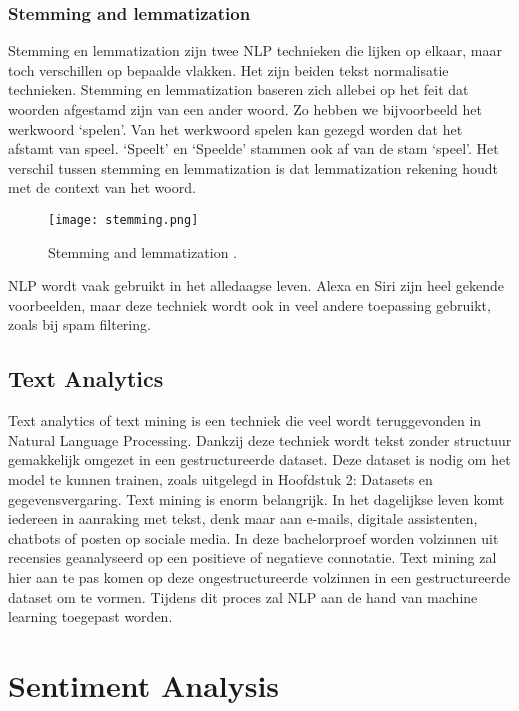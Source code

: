 \subsubsection{Stemming and lemmatization}
\label{sec:stemming}

Stemming en lemmatization zijn twee NLP technieken die lijken op elkaar, maar toch verschillen op bepaalde vlakken. Het zijn beiden tekst normalisatie technieken. Stemming en lemmatization baseren zich allebei op het feit dat woorden afgestamd zijn van een ander woord. Zo hebben we bijvoorbeeld het werkwoord ‘spelen’. Van het werkwoord spelen kan gezegd worden dat het afstamt van speel. ‘Speelt’ en ‘Speelde’ stammen ook af van de stam ‘speel’. Het verschil tussen stemming en lemmatization is dat lemmatization rekening houdt met de context van het woord. \autocite{sas2020}

\begin{figure}[!htbp]
    \texttt{[image: stemming.png]}
    \caption{\label{stemming}Stemming and lemmatization \autocite{sas2020}.}
\end{figure}
\FloatBarrier

NLP wordt vaak gebruikt in het alledaagse leven. Alexa en Siri zijn heel gekende voorbeelden, maar deze techniek wordt ook in veel andere toepassing gebruikt, zoals bij spam filtering. 

\subsection{Text Analytics}
\label{sec:textanalytics}

Text analytics of text mining is een techniek die veel wordt teruggevonden in Natural Language Processing. Dankzij deze techniek wordt tekst zonder structuur gemakkelijk omgezet in een gestructureerde dataset. \autocite{Linguamatics2021} Deze dataset is nodig om het model te kunnen trainen, zoals uitgelegd in Hoofdstuk 2: Datasets en gegevensvergaring.
Text mining is enorm belangrijk. In het dagelijkse leven komt iedereen in aanraking met tekst, denk maar aan e-mails, digitale assistenten, chatbots of posten op sociale media. In deze bachelorproef worden volzinnen uit recensies geanalyseerd op een positieve of negatieve connotatie. Text mining zal hier aan te pas komen op deze ongestructureerde volzinnen in een gestructureerde dataset om te vormen. Tijdens dit proces zal NLP aan de hand van machine learning toegepast worden. 

\section{Sentiment Analysis}
\label{sec:sentimentanalysis}

